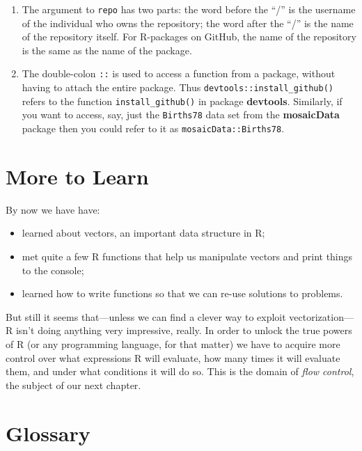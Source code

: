 \documentclass[]{book}
\providecommand{\tightlist}{%
  \setlength{\itemsep}{0pt}\setlength{\parskip}{0pt}}
\theoremstyle{definition}
\theoremstyle{definition}
\theoremstyle{remark}
\begin{document}
{\begin{enumerate}
\def\labelenumi{\arabic{enumi}.}
\tightlist
\item
  The argument to \texttt{repo} has two parts: the word before the ``/''
  is the username of the individual who owns the repository; the word
  after the ``/'' is the name of the repository itself. For R-packages
  on GitHub, the name of the repository is the same as the name of the
  package.
\item
  The double-colon \texttt{::} is used to access a function from a
  package, without having to attach the entire package. Thus
  \texttt{devtools::install\_github()} refers to the function
  \texttt{install\_github()} in package \textbf{devtools}. Similarly, if
  you want to access, say, just the \texttt{Births78} data set from the
  \textbf{mosaicData} package then you could refer to it as
  \texttt{mosaicData::Births78}.
\end{enumerate}

\section{More to Learn}\label{more-to-learn}

By now we have have:

\begin{itemize}
\tightlist
\item
  learned about vectors, an important data structure in R;
\item
  met quite a few R functions that help us manipulate vectors and print
  things to the console;
\item
  learned how to write functions so that we can re-use solutions to
  problems.
\end{itemize}

But still it seems that---unless we can find a clever way to exploit
vectorization---R isn't doing anything very impressive, really. In order
to unlock the true powers of R (or any programming language, for that
matter) we have to acquire more control over what expressions R will
evaluate, how many times it will evaluate them, and under what
conditions it will do so. This is the domain of \emph{flow control}, the
subject of our next chapter.

\newpage

\section*{Glossary}\label{glossary-1}

}
\end{document}
